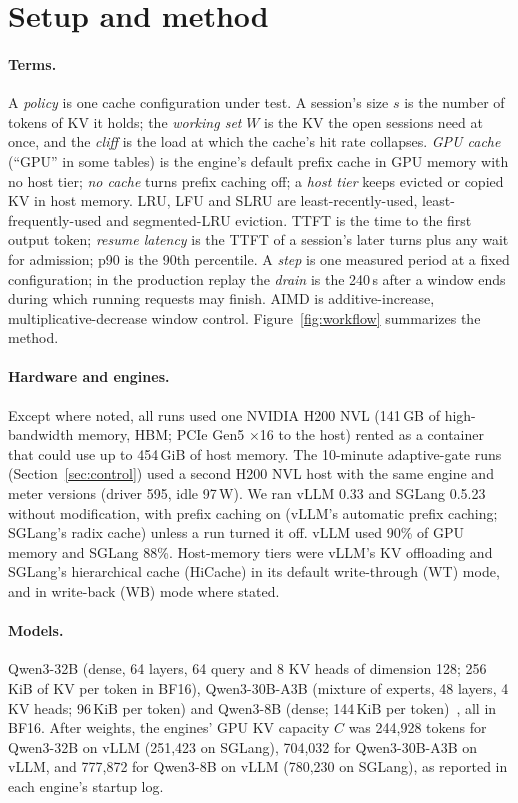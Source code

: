 \section{Setup and method}
\label{sec:setup}

\paragraph{Terms.} A \emph{policy} is one cache configuration under test. A session's size $s$ is the number of tokens of
KV it holds; the \emph{working set} $W$ is the KV the open sessions need at once, and the \emph{cliff} is the load at
which the cache's hit rate collapses. \emph{GPU cache} (``GPU'' in some tables) is the engine's default prefix cache in GPU memory with no
host tier; \emph{no cache} turns prefix caching off; a \emph{host tier} keeps evicted or copied KV in host memory. LRU,
LFU and SLRU are least-recently-used, least-frequently-used and segmented-LRU eviction. TTFT is the time to the first
output token; \emph{resume latency} is the TTFT of a session's later turns plus any wait for admission; p90 is the 90th
percentile. A \emph{step} is one measured period at a fixed configuration; in the production replay
the \emph{drain} is the 240\,s after a window ends during which running requests may finish. AIMD is
additive-increase, multiplicative-decrease window control. Figure~\ref{fig:workflow} summarizes the method.

\paragraph{Hardware and engines.} Except where noted, all runs used one NVIDIA H200 NVL (141\,GB of high-bandwidth memory, HBM; PCIe Gen5 $\times$16 to the host) rented
as a container that could use up to 454\,GiB of host memory. The 10-minute adaptive-gate runs (Section~\ref{sec:control}) used a second H200 NVL host with the same
engine and meter versions (driver 595, idle 97\,W). We ran vLLM 0.33 and SGLang 0.5.23 without modification, with prefix
caching on (vLLM's automatic prefix caching; SGLang's radix cache) unless a run turned it off. vLLM used 90\% of GPU
memory and SGLang 88\%. Host-memory tiers were vLLM's KV offloading and SGLang's hierarchical cache (HiCache) in its
default write-through (WT) mode, and in write-back (WB) mode where stated.

\paragraph{Models.} Qwen3-32B (dense, 64 layers, 64 query and 8 KV heads of dimension 128; 256\,KiB of KV per token in BF16),
Qwen3-30B-A3B (mixture of experts, 48 layers, 4 KV heads; 96\,KiB per token) and Qwen3-8B (dense; 144\,KiB per
token)~\cite{qwen3}, all in BF16\@. After weights, the engines' GPU KV capacity $C$ was 244,928 tokens for Qwen3-32B on
vLLM (251,423 on SGLang), 704,032 for Qwen3-30B-A3B on vLLM, and 777,872 for Qwen3-8B on vLLM (780,230 on SGLang), as
reported in each engine's startup log.

